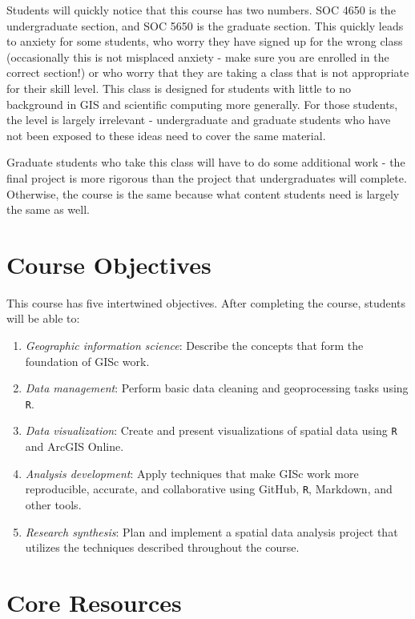 \documentclass[
]{book}
\begin{document}
Students will quickly notice that this course has two numbers. SOC 4650 is the undergraduate section, and SOC 5650 is the graduate section. This quickly leads to anxiety for some students, who worry they have signed up for the wrong class (occasionally this is not misplaced anxiety - make sure you are enrolled in the correct section!) or who worry that they are taking a class that is not appropriate for their skill level. This class is designed for students with little to no background in GIS and scientific computing more generally. For those students, the level is largely irrelevant - undergraduate and graduate students who have not been exposed to these ideas need to cover the same material.

Graduate students who take this class will have to do some additional work - the final project is more rigorous than the project that undergraduates will complete. Otherwise, the course is the same because what content students need is largely the same as well.

\hypertarget{course-objectives}{%
\section{Course Objectives}\label{course-objectives}}

This course has five intertwined objectives. After completing the course, students will be able to:

\begin{enumerate}
\def\labelenumi{\arabic{enumi}.}
\item
  \emph{Geographic information science}: Describe the concepts that form the foundation of GISc work.
\item
  \emph{Data management}: Perform basic data cleaning and geoprocessing tasks using \texttt{R}.
\item
  \emph{Data visualization}: Create and present visualizations of spatial data using \texttt{R} and ArcGIS Online.
\item
  \emph{Analysis development}: Apply techniques that make GISc work more reproducible, accurate, and collaborative using GitHub, \texttt{R}, Markdown, and other tools.
\item
  \emph{Research synthesis}: Plan and implement a spatial data analysis project that utilizes the techniques described throughout the course.
\end{enumerate}

\hypertarget{core-resources}{%
\section{Core Resources}\label{core-resources}}
\end{document}
